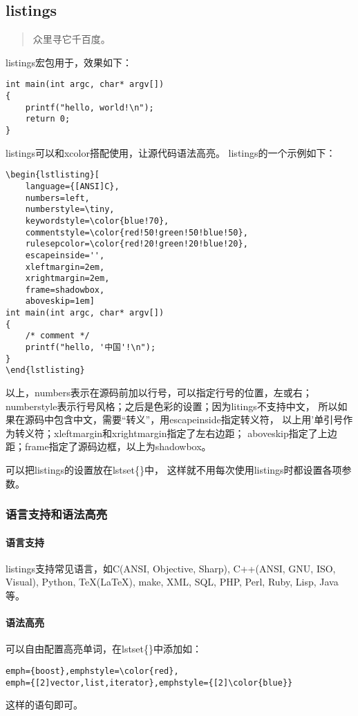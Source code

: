 \subsection{listings}
\begin{quote}
众里寻它千百度。
\end{quote}

listings宏包用于，效果如下：
\begin{lstlisting}
int main(int argc, char* argv[])
{
    printf("hello, world!\n");
    return 0;
}
\end{lstlisting}

listings可以和xcolor搭配使用，让源代码语法高亮。
listings的一个示例如下：
\begin{Verbatim}[frame=single, rulecolor=\color{green}]
\begin{lstlisting}[
    language={[ANSI]C},
    numbers=left,
    numberstyle=\tiny,
    keywordstyle=\color{blue!70},
    commentstyle=\color{red!50!green!50!blue!50},
    rulesepcolor=\color{red!20!green!20!blue!20},
    escapeinside='',
    xleftmargin=2em,
    xrightmargin=2em,
    frame=shadowbox,
    aboveskip=1em]
int main(int argc, char* argv[])
{
    /* comment */
    printf("hello, '中国'!\n");
}
\end{lstlisting}
\end{Verbatim}

以上，numbers表示在源码前加以行号，可以指定行号的位置，左或右；
numberstyle表示行号风格；之后是色彩的设置；因为litings不支持中文，
所以如果在源码中包含中文，需要“转义”，用escapeinside指定转义符，
以上用'单引号作为转义符；xleftmargin和xrightmargin指定了左右边距；
aboveskip指定了上边距；frame指定了源码边框，以上为shadowbox。

可以把listings的设置放在lstset\{\}中，
这样就不用每次使用listings时都设置各项参数。

\subsubsection{语言支持和语法高亮}
\paragraph{语言支持}
listings支持常见语言，如C(ANSI, Objective, Sharp), 
    C++(ANSI, GNU, ISO, Visual), Python, \TeX(\LaTeX), 
    make, XML, SQL,
    PHP, Perl, Ruby, Lisp, Java等。

\paragraph{语法高亮}
可以自由配置高亮单词，在lstset\{\}中添加如：
\begin{lstlisting}
emph={boost},emphstyle=\color{red},
emph={[2]vector,list,iterator},emphstyle={[2]\color{blue}}
\end{lstlisting}
这样的语句即可。


